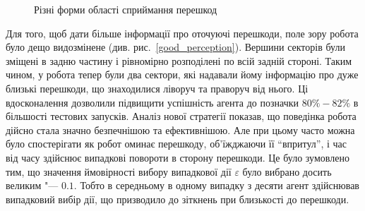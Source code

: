 \begin{figure}
	\centering
	\;
	\caption{Різні форми області сприймання перешкод}
	\label{bad_and_good_perception}
\end{figure}


Для того, щоб дати більше інформації про оточуючі перешкоди, поле зору робота було дещо видозмінене (див. рис.~\ref{good_perception}). Вершини секторів були зміщені в задню частину і рівномірно розподілені по всій задній стороні. Таким чином, у робота тепер були два сектори, які надавали йому інформацію про дуже близькі перешкоди, що знаходилися ліворуч та праворуч від нього. Ці вдосконалення дозволили підвищити успішність агента до позначки $80\%-82\%$ в більшості тестових запусків. Аналіз нової стратегії показав, що поведінка робота дійсно стала значно безпечнішою та ефективнішою. Але при цьому часто можна було спостерігати як робот оминає перешкоду, об'їжджаючи її ``впритул'', і час від часу здійснює випадкові повороти в сторону перешкоди. Це було зумовлено тим, що значення ймовірності вибору випадкової дії $\varepsilon$ було вибрано досить великим "--- $0.1$. Тобто в середньому в одному випадку з десяти агент здійснював випадковий вибір дії, що призводило до зіткнень при близькості до перешкоди.

